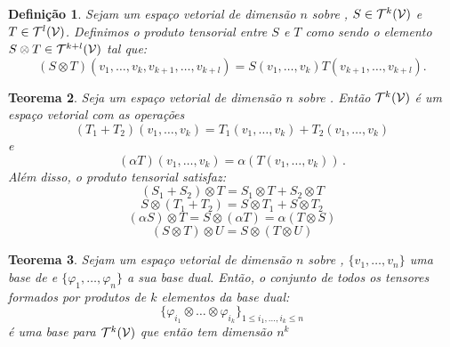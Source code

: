 \documentclass[a4paper,12pt]{extreport}
\newtheorem{mydef}{Definição}
\newtheorem{myteo}[mydef]{Teorema}
\begin{document}
\begin{mydef}
  Sejam \Vcal{} um espaço vetorial de dimensão $n$ sobre \realnumb{},
  $S \in \mathcal{T}^k(\mathcal{V})$ e $T \in \mathcal{T}^l(\mathcal{V})$.
  Definimos o \emph{produto tensorial} entre $S$ e $T$
  como sendo o elemento
  $S \otimes T \in \mathcal{T}^{k+l}(\mathcal{V})$ tal que:
  \begin{equation}
    (S \otimes T)(v_1, \dots, v_k, v_{k+1}, \dots, v_{k+l})
    = S(v_1, \dots, v_k)T(v_{k+1}, \dots, v_{k+l}).
  \end{equation}
\end{mydef}


\begin{myteo}
  Seja \Vcal{} um espaço vetorial de dimensão $n$ sobre \realnumb{}.
  Então $\mathcal{T}^k(\mathcal{V})$ é um espaço vetorial com as operações
  \begin{equation}
    (T_1 + T_2)(v_1, \dots, v_k) =
    T_1(v_1, \dots, v_k) + T_2(v_1, \dots, v_k)
  \end{equation}
  e
  \begin{equation}
    (\alpha T)(v_1, \dots, v_k) =
    \alpha (T(v_1, \dots, v_k))\,.
  \end{equation}
  Além disso, o produto tensorial satisfaz:
  \begin{equation}
    (S_1 + S_2) \otimes T = S_1 \otimes T + S_2 \otimes T
  \end{equation}
  \begin{equation}
    S \otimes (T_1 + T_2) = S \otimes T_1 + S \otimes T_2
  \end{equation}
  \begin{equation}
    (\alpha S) \otimes T = S \otimes (\alpha T) = \alpha (T \otimes S)
  \end{equation}
  \begin{equation}
    (S \otimes T) \otimes U = S \otimes (T \otimes U)
  \end{equation}
\end{myteo}


\begin{myteo}
  Sejam \Vcal{} um espaço vetorial de dimensão $n$ sobre \realnumb{},
  $\{v_1, \dots, v_n\}$ uma base de \Vcal{} e
  $\{\varphi_1, \dots, \varphi_n\}$ a sua base dual.
  Então, o conjunto de todos os tensores formados por produtos
  de $k$ elementos da base dual:
  {\Large
    \begin{equation}
      \{ \varphi_{i_1} \otimes \dots \otimes \varphi_{i_k}\}_{
        1 \le i_1, \dots, i_k \le n}
    \end{equation}
  }
  é uma base para $\mathcal{T}^k(\mathcal{V})$
  que então tem dimensão $n^k$
\end{myteo}
\end{document}
